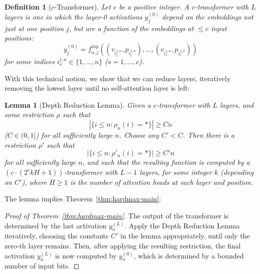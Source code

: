 \documentclass[11pt,a4paper]{article}
\newcounter{theorem}
\newtheorem{defin}[theorem]{Definition}
\newtheorem{lemma}[theorem]{Lemma}
\begin{document}
\begin{defin}[$c$-Transformer]
Let $c$ be a positive integer. A $c$-transformer with $L$ layers is one in which the layer-0 activations $y_j^{(0)}$ depend on the embeddings not just at one position $j$, but are a function of the embeddings at $\leq c$ input positions:
\begin{equation}
    y_j^{(0)} = f^{inp}_{n,j}((v_{i_1^{j,n}}, p_{i_1^{j,n}}), \dots, (v_{i_c^{j,n}}, p_{i_c^{j,n}} ))
\end{equation}
for some indices ${i_s^{j,n}} \in \{1, \dots, n\}$ ($s = 1, \dots, c$).
\end{defin}


With this technical notion, we show that we can reduce layers, iteratively removing the lowest layer until no self-attention layer is left:

\begin{lemma}[Depth Reduction Lemma]\label{lemma:depth-red}
Given a $c$-transformer with $L$ layers, and some restriction $\rho$ such that
\begin{equation}
|\{i \leq n: \rho_n(i) = *\}| \geq Cn
\end{equation}
($C \in (0,1]$)
for all sufficiently large $n$.
Choose any $C' < C$.
Then there is a restriction $\rho'$ 
such that
\begin{equation}
|\{i \leq n: \rho'_n(i) = *\}| \geq C'n
\end{equation}
for all sufficiently large $n$, 
and such that the resulting function is computed by a $( c\cdot(2^ckH+1))$-transformer with $L-1$ layers, for some integer $k$ (depending on $C'$), where $H \geq 1$ is the number of attention heads at each layer and position.
\end{lemma}
The lemma implies Theorem~\ref{thm:hardmax-main}:
\begin{proof}[Proof of Theorem~\ref{thm:hardmax-main}]
The output of the transformer is determined by the last activation $y_{n}^{(L)}$.
Apply the Depth Reduction Lemma iteratively, choosing the constants $C'$ in the lemma appropriately, until only the zero-th layer remains.
Then, after applying the resulting restriction, the final activation $y_{n}^{(L)}$ is now computed by $y_{n}^{(0)}$, which is determined by a bounded number of input bits.
\end{proof}
\end{document}
